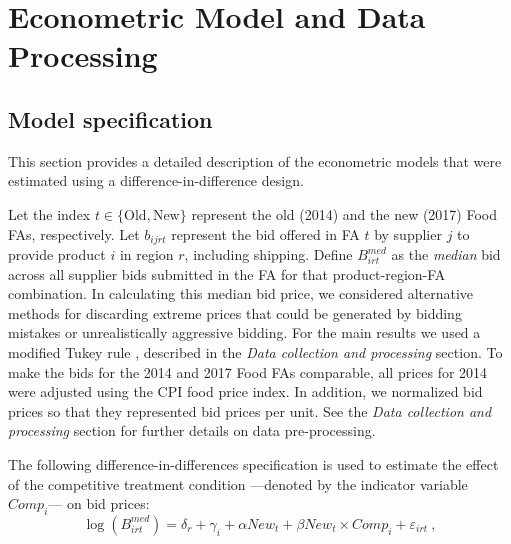 


\chapter{Econometric Model and Data Processing} \label{app:data}


\section{Model specification}

This section provides a detailed description of the econometric models that were estimated using a difference-in-difference design.

Let the index $t\in\{\text{Old},\text{New}\}$ represent the old (2014) and the new (2017) Food FAs, respectively.  Let $b_{ijrt}$ represent the bid offered in FA $t$ by supplier $j$ to provide product $i$ in region $r$, including shipping.  Define $B^{med}_{irt}$ as the \textit{median} bid across all supplier bids submitted in the FA for that product-region-FA combination. In calculating this median bid price, we considered alternative methods for discarding extreme prices that could be generated by bidding mistakes or unrealistically aggressive bidding. For the main results we used a modified Tukey rule \citep{Tukey1977}, described in the \textit{Data collection and processing} section. To make the bids for the 2014 and 2017 Food FAs comparable, all prices for 2014 were adjusted using the CPI food price index. In addition, we normalized bid prices so that they represented bid prices per unit. See the \textit{Data collection and processing} section for further details on data pre-processing. 

The following difference-in-differences specification is used to estimate the effect of the competitive treatment condition ---denoted by the indicator variable $Comp_{i}$--- on bid prices:
\begin{equation}
    \log (B^{med}_{irt}) = \delta_r + \gamma_i + \alpha New_{t} + \beta New_{t}\times Comp_{i} + \varepsilon_{irt} \ ,
    \label{eq:reg_sub_bid}
\end{equation}

